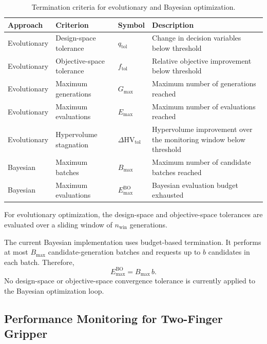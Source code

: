 \begin{table}[htbp]
\centering
\caption{Termination criteria for evolutionary and Bayesian optimization.}
\label{tab:two_finger_termination}
\begin{tabularx}{\textwidth}{@{}l l l >{\raggedright\arraybackslash}X@{}}
\toprule
\textbf{Approach} & \textbf{Criterion} & \textbf{Symbol} & \textbf{Description} \\
\midrule
Evolutionary & Design-space tolerance & $q_{\mathrm{tol}}$ & Change in decision variables below
threshold \\

Evolutionary & Objective-space tolerance & $f_{\mathrm{tol}}$ & Relative objective improvement below
threshold \\

Evolutionary & Maximum generations & $G_{\max}$ & Maximum number of generations reached \\

Evolutionary & Maximum evaluations & $E_{\max}$ & Maximum number of evaluations reached \\

Evolutionary & Hypervolume stagnation & $\Delta\mathrm{HV}_{\mathrm{tol}}$ & Hypervolume improvement
over the monitoring window below threshold \\

Bayesian & Maximum batches & $B_{\max}$ & Maximum number of candidate batches reached \\

Bayesian & Maximum evaluations & $E_{\max}^{\mathrm{BO}}$ & Bayesian evaluation budget exhausted \\
\bottomrule
\end{tabularx}
\end{table}

For evolutionary optimization, the design-space and objective-space tolerances are evaluated over a
sliding window of $n_{\mathrm{win}}$ generations.

The current Bayesian implementation uses budget-based termination. It performs at most $B_{\max}$
candidate-generation batches and requests up to $b$ candidates in each batch. Therefore,
\begin{equation}
    E_{\max}^{\mathrm{BO}} = B_{\max}\,b .
\end{equation}
No design-space or objective-space convergence tolerance is currently applied to the Bayesian
optimization loop.

\subsection{Performance Monitoring for Two-Finger Gripper}
\label{sec:two_finger_monitoring}

